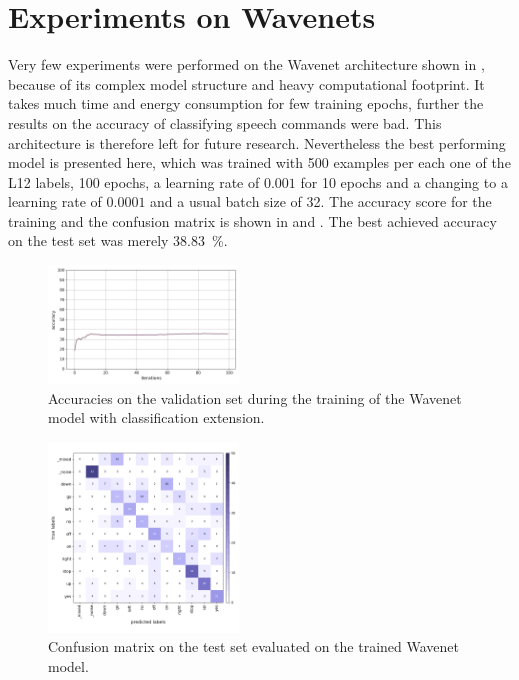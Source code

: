 
\section{Experiments on Wavenets}\label{exp_wavenet}
\thesisStateRevised
Very few experiments were performed on the Wavenet architecture shown in , because of its complex model structure and heavy computational footprint.
It takes much time and energy consumption for few training epochs, further the results on the accuracy of classifying speech commands were bad.
This architecture is therefore left for future research.
Nevertheless the best performing model is presented here, which was trained with 500 examples per each one of the L12 labels, 100 epochs, a learning rate of $0.001$ for 10 epochs and a changing to a learning rate of $0.0001$ and a usual batch size of 32.
The accuracy score for the training and the confusion matrix is shown in  and .
The best achieved accuracy on the test set was merely \SI{38.83}{\percent}.
\begin{figure}[!ht]
  \centering
  \includegraphics[width=0.45\textwidth]{./5_exp/figs/exp_wavenet_acc.png}
  \caption{Accuracies on the validation set during the training of the Wavenet model with classification extension.}
  \label{fig:exp_wavenet_acc}
\end{figure}
\begin{figure}[!ht]
  \centering
  \includegraphics[width=0.45\textwidth]{./5_exp/figs/exp_wavenet_confusion_test.png}
  \caption{Confusion matrix on the test set evaluated on the trained Wavenet model.}
  \label{fig:exp_wavenet_confusion}
\end{figure}
\FloatBarrier
\noindent
